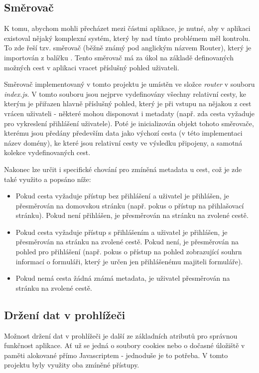 	\subsection{Směrovač}\label{sec:fe_router} %
	K tomu, abychom mohli přecházet mezi částmi aplikace, je nutné, aby v aplikaci existoval nějaký komplexní systém, který by nad tímto problémem měl kontrolu. To zde řeší tzv. směrovač (běžně známý pod anglickým názvem Router), který je importován z balíčku . Tento směrovač má za úkol na základě definovaných možných cest v aplikaci vracet příslušný pohled uživateli.
	
	Směrovač implementovaný v tomto projektu je umístěn ve složce \textit{router} v souboru \textit{index.js}. V tomto souboru jsou nejprve vydefinovány všechny relativní cesty, ke kterým je přiřazen hlavně příslušný pohled, který je při vstupu na nějakou z cest vrácen uživateli - některé mohou disponovat i metadaty (např. zda cesta vyžaduje pro vykreslení přihlášení uživatele). Poté je inicializován objekt tohoto směrovače, kterému jsou předány především data jako výchozí cesta (v této implementaci název domény), ke které jsou relativní cesty ve výsledku připojeny, a samotná kolekce vydefinovaných cest. 
	
	Nakonec lze určit i specifické chování pro zmíněná metadata u cest, což je zde také využito a popsáno níže:
	\begin{itemize}
		\item Pokud cesta vyžaduje přístup bez přihlášení a uživatel je přihlášen, je přesměrován na domovskou stránku (např. pokus o přístup na přihlašovací stránku). Pokud není přihlášen, je přesměrován na stránku na zvolené cestě.
		\item Pokud cesta vyžaduje přístup s přihlášením a uživatel je přihlášen, je přesměrován na stránku na zvolené cestě. Pokud není, je přesměrován na pohled pro přihlášení (např. pokus o přístup na pohled zobrazující souhrn informací o formuláři, který je určen jen přihlášenému majiteli formuláře).
		\item Pokud nemá cesta žádná známá metadata, je uživatel přesměrován na stránku na zvolené cestě.
	\end{itemize}

	\subsection{Držení dat v prohlížeči} %
	Možnost držení dat v prohlížeči je další ze základních atributů pro správnou funkčnost aplikace. Ať už se jedná o soubory cookies nebo o dočasné úložiště v paměti alokované přímo Javascriptem - jednoduše je to potřeba. V tomto projektu byly využity oba zmíněné přístupy.
	

